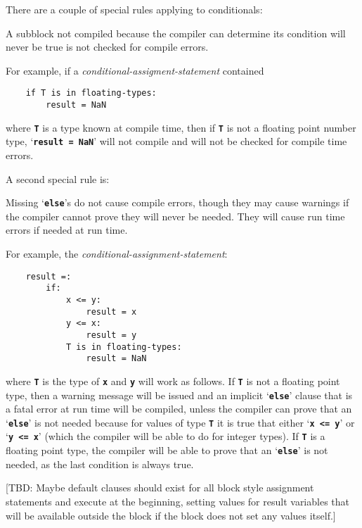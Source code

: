 \documentclass[12pt]{article}
\newcommand{\TT}[1]{{\tt \bfseries #1}}
\newenvironment{indpar}[1][0.3in]%
	{\begin{list}{}%
		     {\setlength{\itemsep}{0in}%
		      \setlength{\topsep}{0in}%
		      \setlength{\parsep}{1ex}%
		      \setlength{\labelwidth}{#1}%
		      \setlength{\leftmargin}{#1}%
		      \addtolength{\leftmargin}{\labelsep}}%
	 \item}%
	{\end{list}}
\begin{document}
There are a couple of special rules applying to conditionals:%
\label{CONDITIONAL-SPECIAL-RULES}

\begin{indpar}
A subblock not compiled because the compiler can determine its
condition will never be true is not checked for compile errors.
\end{indpar}

For example, if a {\em conditional-assigment-statement}
contained
\begin{indpar}\begin{verbatim}
    if T is in floating-types:
        result = NaN
\end{verbatim}\end{indpar}
where \TT{T} is a type known at compile time,
then if \TT{T} is not a floating
point number type, `\TT{result = NaN}' will not compile
and will not be checked for compile time errors.


A second special rule is:

\begin{indpar}
Missing `\TT{else}'s do not cause compile errors, though they
may cause warnings if the compiler cannot prove they will never
be needed.  They will cause run time errors if needed at run time.
\end{indpar}

For example, the {\em conditional-assignment-statement}:
\begin{indpar}\begin{verbatim}
    result =:
        if:
            x <= y:
                result = x
            y <= x:
                result = y
            T is in floating-types:
                result = NaN
\end{verbatim}\end{indpar}
where \TT{T} is the type of \TT{x} and \TT{y} will work as
follows.  If \TT{T} is not a floating point type, then a
warning message will be issued and an implicit `\TT{else}'
clause that is a fatal error at run time will be compiled, unless the
compiler can prove that an `\TT{else}' is not needed because
for values of type \TT{T} it is
true that either `\TT{x~<=~y}' or `\TT{y~<=~x}' (which
the compiler will be able to do for integer types).  If
\TT{T} is a floating point type, the compiler will be able
to prove that an `\TT{else}' is not needed, as the last condition
is always true.

[TBD: Maybe default clauses should exist for all block style
assignment statements and execute at the beginning, setting
values for result variables that will be available outside
the block if the block does not set any values itself.]
\end{document}
